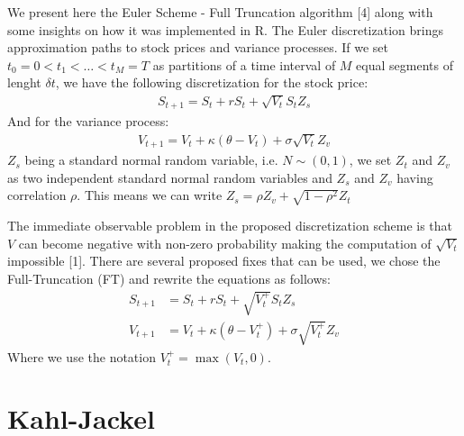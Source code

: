 \documentclass[12pt,twoside]{reedthesis}
\theoremstyle{definition}
\theoremstyle{definition}
\theoremstyle{remark}
\begin{document}
  We present here the Euler Scheme - Full Truncation algorithm {[}4{]}
  along with some insights on how it was implemented in R. The Euler
  discretization brings approximation paths to stock prices and variance
  processes. If we set \(t_0 = 0 < t_1 < \dots < t_M = T\) as partitions
  of a time interval of \(M\) equal segments of lenght \(\delta t\), we
  have the following discretization for the stock price:
  \begin{align}
  S_{t+1} = S_t + rS_t + \sqrt{V_t} S_t Z_s
  \end{align}
  \noindent
  And for the variance process:
  \begin{align}
  V_{t+1} = V_t + \kappa (\theta - V_t) + \sigma \sqrt{V_t} Z_v
  \end{align}
  \noindent
  \(Z_s\) being a standard normal random variable, i.e. \(N\sim(0,1)\), we
  set \(Z_t\) and \(Z_v\) as two independent standard normal random
  variables and \(Z_s\) and \(Z_v\) having correlation \(\rho\). This
  means we can write \(Z_s = \rho Z_v + \sqrt{1-\rho^2} Z_t\)
  
  The immediate observable problem in the proposed discretization scheme
  is that \(V\) can become negative with non-zero probability making the
  computation of \(\sqrt{V_t}\) impossible {[}1{]}. There are several
  proposed fixes that can be used, we chose the Full-Truncation (FT) and
  rewrite the equations as follows:
  \begin{align}
  S_{t+1} &= S_t + rS_t + \sqrt{V_{t}^{+}} S_t Z_s \\
  V_{t+1} &= V_t + \kappa (\theta - V_{t}^{+}) + \sigma \sqrt{V_{t}^{+}} Z_v
  \end{align}
  \noindent
  Where we use the notation \(V_{t}^{+} = \max(V_{t}, 0)\).
  
  \section{Kahl-Jackel}\label{kahl-jackel}
  
\end{document}
